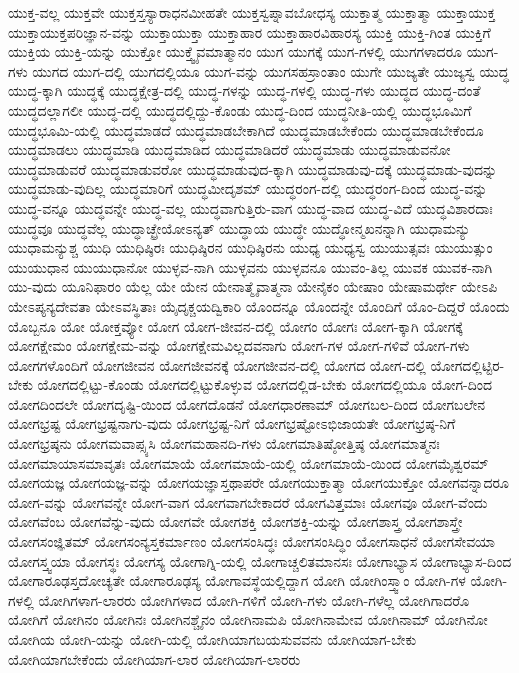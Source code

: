 {ಯುಕ್ತ-ವಲ್ಲ
ಯುಕ್ತವೇ
ಯುಕ್ತಸ್ತಸ್ಯಾರಾಧನಮೀಹತೇ
ಯುಕ್ತಸ್ವಪ್ನಾವಬೋಧಸ್ಯ
ಯುಕ್ತಾತ್ಮ
ಯುಕ್ತಾತ್ಮಾ
ಯುಕ್ತಾಯುಕ್ತ
ಯುಕ್ತಾಯುಕ್ತಪರಿಜ್ಞಾನ-ವನ್ನು
ಯುಕ್ತಾಯುಕ್ತಾ
ಯುಕ್ತಾಹಾರ
ಯುಕ್ತಾಹಾರವಿಹಾರಸ್ಯ
ಯುಕ್ತಿ
ಯುಕ್ತಿ-ಗಿಂತ
ಯುಕ್ತಿಗೆ
ಯುಕ್ತಿಯ
ಯುಕ್ತಿ-ಯನ್ನು
ಯುಕ್ತೋ
ಯುಕ್ತ್ವೈವಮಾತ್ಮಾನಂ
ಯುಗ
ಯುಗಕ್ಕೆ
ಯುಗ-ಗಳಲ್ಲಿ
ಯುಗಗಳಾದರೂ
ಯುಗ-ಗಳು
ಯುಗದ
ಯುಗ-ದಲ್ಲಿ
ಯುಗದಲ್ಲಿಯೂ
ಯುಗ-ವನ್ನು
ಯುಗಸಹಸ್ರಾಂತಾಂ
ಯುಗೇ
ಯುಜ್ಯತೇ
ಯುಜ್ಯಸ್ವ
ಯುದ್ಧ
ಯುದ್ಧ-ಕ್ಕಾಗಿ
ಯುದ್ಧಕ್ಕೆ
ಯುದ್ಧಕ್ಷೇತ್ರ-ದಲ್ಲಿ
ಯುದ್ಧ-ಗಳನ್ನು
ಯುದ್ಧ-ಗಳಲ್ಲಿ
ಯುದ್ಧ-ಗಳು
ಯುದ್ಧದ
ಯುದ್ಧ-ದಂತೆ
ಯುದ್ಧದಲ್ಲಾಗಲೀ
ಯುದ್ಧ-ದಲ್ಲಿ
ಯುದ್ಧದಲ್ಲಿದ್ದು-ಕೊಂಡು
ಯುದ್ಧ-ದಿಂದ
ಯುದ್ಧನೀತಿ-ಯಲ್ಲಿ
ಯುದ್ಧಭೂಮಿಗೆ
ಯುದ್ಧಭೂಮಿ-ಯಲ್ಲಿ
ಯುದ್ಧಮಾಡದೆ
ಯುದ್ಧಮಾಡಬೇಕಾಗಿದೆ
ಯುದ್ಧಮಾಡಬೇಕೆಂದು
ಯುದ್ಧಮಾಡಬೇಕೆಂದೂ
ಯುದ್ಧಮಾಡಲು
ಯುದ್ಧಮಾಡಿ
ಯುದ್ಧಮಾಡಿದ
ಯುದ್ಧಮಾಡಿದರೆ
ಯುದ್ಧಮಾಡು
ಯುದ್ಧಮಾಡುವನೋ
ಯುದ್ಧಮಾಡುವರೆ
ಯುದ್ಧಮಾಡುವರೋ
ಯುದ್ಧಮಾಡುವುದ-ಕ್ಕಾಗಿ
ಯುದ್ಧಮಾಡುವು-ದಕ್ಕೆ
ಯುದ್ಧಮಾಡು-ವುದನ್ನು
ಯುದ್ಧಮಾಡು-ವುದಿಲ್ಲ
ಯುದ್ಧಮಾರಿಗೆ
ಯುದ್ಧಮೀದೃಶಮ್
ಯುದ್ಧರಂಗ-ದಲ್ಲಿ
ಯುದ್ಧರಂಗ-ದಿಂದ
ಯುದ್ಧ-ವನ್ನು
ಯುದ್ಧ-ವನ್ನೂ
ಯುದ್ಧವನ್ನೇ
ಯುದ್ಧ-ವಲ್ಲ
ಯುದ್ಧವಾಗುತ್ತಿರು-ವಾಗ
ಯುದ್ಧ-ವಾದ
ಯುದ್ಧ-ವಿದೆ
ಯುದ್ಧವಿಶಾರದಾಃ
ಯುದ್ಧವೂ
ಯುದ್ಧವೆಲ್ಲ
ಯುದ್ಧಾಚ್ಛ್ರೇಯೋಽನ್ಯತ್
ಯುದ್ಧಾಯ
ಯುದ್ಧೇ
ಯುದ್ಧೋನ್ಮಖನನ್ನಾಗಿ
ಯುಧಾಮನ್ಯು
ಯುಧಾಮನ್ಯುಶ್ಚ
ಯುಧಿ
ಯುಧಿಷ್ಠಿರಃ
ಯುಧಿಷ್ಠಿರನ
ಯುಧಿಷ್ಠಿರನು
ಯುಧ್ಯ
ಯುಧ್ಯಸ್ವ
ಯುಯುತ್ಸವಃ
ಯುಯುತ್ಸುಂ
ಯುಯುಧಾನ
ಯುಯುಧಾನೋ
ಯುಳ್ಳವ-ನಾಗಿ
ಯುಳ್ಳವನು
ಯುಳ್ಳವನೂ
ಯುವಂ-ತಿಲ್ಲ
ಯುವಕ
ಯುವಕ-ನಾಗಿ
ಯು-ವುದು
ಯೂನಿಫಾರಂ
ಯೆಲ್ಲ
ಯೇ
ಯೇನ
ಯೇನಾತ್ಮೈವಾತ್ಮನಾ
ಯೇನೈಕಂ
ಯೇಷಾಂ
ಯೇಷಾಮರ್ಥೇ
ಯೇಽಪಿ
ಯೇಽಪ್ಯನ್ಯದೇವತಾ
ಯೇಽವಸ್ಥಿತಾಃ
ಯೈದೃಕ್ಚಯದ್ವಿಕಾರಿ
ಯೊಂದನ್ನೂ
ಯೊಂದನ್ನೇ
ಯೊಂದಿಗೆ
ಯೊಂ-ದಿದ್ದರೆ
ಯೊಂದು
ಯೊಬ್ಬನೂ
ಯೋ
ಯೋಕ್ತವ್ಯೋ
ಯೋಗ
ಯೋಗ-ಜೀವನ-ದಲ್ಲಿ
ಯೋಗಂ
ಯೋಗಃ
ಯೋಗ-ಕ್ಕಾಗಿ
ಯೋಗಕ್ಕೆ
ಯೋಗಕ್ಷೇಮಂ
ಯೋಗಕ್ಷೇಮ-ವನ್ನು
ಯೋಗಕ್ಷೇಮವಿಲ್ಲದವನಾಗು
ಯೋಗ-ಗಳ
ಯೋಗ-ಗಳಿವೆ
ಯೋಗ-ಗಳು
ಯೋಗಗಳೊಂದಿಗೆ
ಯೋಗಜೀವನ
ಯೋಗಜೀವನಕ್ಕೆ
ಯೋಗಜೀವನ-ದಲ್ಲಿ
ಯೋಗದ
ಯೋಗ-ದಲ್ಲಿ
ಯೋಗದಲ್ಲಿಟ್ಟಿರ-ಬೇಕು
ಯೋಗದಲ್ಲಿಟ್ಟು-ಕೊಂಡು
ಯೋಗದಲ್ಲಿಟ್ಟುಕೊಳ್ಳುವ
ಯೋಗದಲ್ಲಿಡ-ಬೇಕು
ಯೋಗದಲ್ಲಿಯೂ
ಯೋಗ-ದಿಂದ
ಯೋಗದಿಂದಲೇ
ಯೋಗದೃಷ್ಟಿ-ಯಿಂದ
ಯೋಗದೊಡನೆ
ಯೋಗಧಾರಣಾಮ್
ಯೋಗಬಲ-ದಿಂದ
ಯೋಗಬಲೇನ
ಯೋಗಭ್ರಷ್ಟ
ಯೋಗಭ್ರಷ್ಟನಾಗು-ವುದು
ಯೋಗಭ್ರಷ್ಟ-ನಿಗೆ
ಯೋಗಭ್ರಷ್ಟೋಽಭಿಜಾಯತೇ
ಯೋಗಭ್ರಷ್ಠ-ನಿಗೆ
ಯೋಗಭ್ರಷ್ಠನು
ಯೋಗಮವಾಪ್ಸ್ಯಸಿ
ಯೋಗಮಹಾನದಿ-ಗಳು
ಯೋಗಮಾತಿಷ್ಠೋತ್ತಿಷ್ಠ
ಯೋಗಮಾತ್ಮನಃ
ಯೋಗಮಾಯಾಸಮಾವೃತಃ
ಯೋಗಮಾಯೆ
ಯೋಗಮಾಯೆ-ಯಲ್ಲಿ
ಯೋಗಮಾಯೆ-ಯಿಂದ
ಯೋಗಮೈಶ್ವರಮ್
ಯೋಗಯಜ್ಞ
ಯೋಗಯಜ್ಞ-ವನ್ನು
ಯೋಗಯಜ್ಞಾಸ್ತಥಾಪರೇ
ಯೋಗಯುಕ್ತಾತ್ಮಾ
ಯೋಗಯುಕ್ತೋ
ಯೋಗವನ್ನಾದರೂ
ಯೋಗ-ವನ್ನು
ಯೋಗವನ್ನೇ
ಯೋಗ-ವಾಗ
ಯೋಗವಾಗಬೇಕಾದರೆ
ಯೋಗವಿತ್ತಮಾಃ
ಯೋಗವೂ
ಯೋಗ-ವೆಂದು
ಯೋಗವೆಂಬ
ಯೋಗವೆನ್ನು-ವುದು
ಯೋಗವೇ
ಯೋಗಶಕ್ತಿ
ಯೋಗಶಕ್ತಿ-ಯನ್ನು
ಯೋಗಶಾಸ್ತ್ರ
ಯೋಗಶಾಸ್ತ್ರೇ
ಯೋಗಸಂಜ್ಞಿತಮ್
ಯೋಗಸಂನ್ಯಸ್ತಕರ್ಮಾಣಂ
ಯೋಗಸಂಸಿದ್ಧಃ
ಯೋಗಸಂಸಿದ್ಧಿಂ
ಯೋಗಸಾಧನೆ
ಯೋಗಸೇವಯಾ
ಯೋಗಸ್ತ್ವಯಾ
ಯೋಗಸ್ಥಃ
ಯೋಗಸ್ಯ
ಯೋಗಾಗ್ನಿ-ಯಲ್ಲಿ
ಯೋಗಾಚ್ಚಲಿತಮಾನಸಃ
ಯೋಗಾಭ್ಯಾಸ
ಯೋಗಾಭ್ಯಾಸ-ದಿಂದ
ಯೋಗಾರೂಢಸ್ತದೋಚ್ಯತೇ
ಯೋಗಾರೂಢಸ್ಯ
ಯೋಗಾವಸ್ಥೆಯಲ್ಲಿದ್ದಾಗ
ಯೋಗಿ
ಯೋಗಿಂಸ್ತ್ವಾಂ
ಯೋಗಿ-ಗಳ
ಯೋಗಿ-ಗಳಲ್ಲಿ
ಯೋಗಿಗಳಾಗ-ಲಾರರು
ಯೋಗಿಗಳಾದ
ಯೋಗಿ-ಗಳಿಗೆ
ಯೋಗಿ-ಗಳು
ಯೋಗಿ-ಗಳೆಲ್ಲ
ಯೋಗಿಗಾದರೊ
ಯೋಗಿಗೆ
ಯೋಗಿನಂ
ಯೋಗಿನಃ
ಯೋಗಿನಶ್ಚೈನಂ
ಯೋಗಿನಾಮಪಿ
ಯೋಗಿನಾಮೇವ
ಯೋಗಿನಾಮ್
ಯೋಗಿನೋ
ಯೋಗಿಯ
ಯೋಗಿ-ಯನ್ನು
ಯೋಗಿ-ಯಲ್ಲಿ
ಯೋಗಿಯಾಗಬಯಸುವವನು
ಯೋಗಿಯಾಗ-ಬೇಕು
ಯೋಗಿಯಾಗಬೇಕೆಂದು
ಯೋಗಿಯಾಗ-ಲಾರ
ಯೋಗಿಯಾಗ-ಲಾರರು
}
